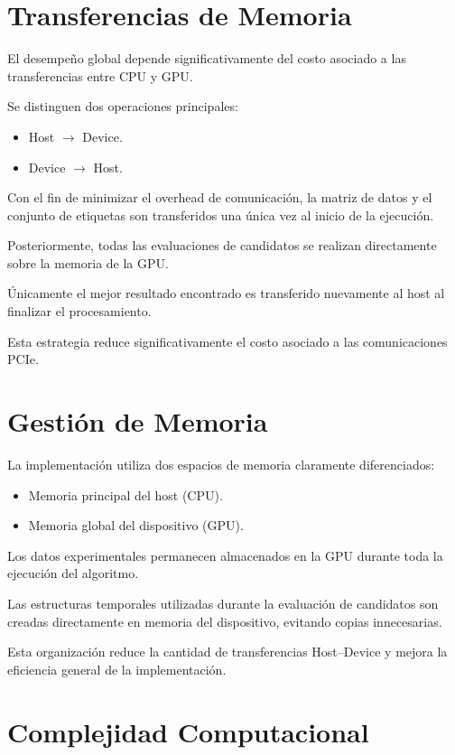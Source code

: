 \section{Transferencias de Memoria}

El desempeño global depende significativamente del costo asociado a las transferencias entre CPU y GPU.

Se distinguen dos operaciones principales:

\begin{itemize}
    \item Host $\rightarrow$ Device.
    \item Device $\rightarrow$ Host.
\end{itemize}

Con el fin de minimizar el overhead de comunicación, la matriz de datos y el conjunto de etiquetas son transferidos una única vez al inicio de la ejecución.

Posteriormente, todas las evaluaciones de candidatos se realizan directamente sobre la memoria de la GPU.

Únicamente el mejor resultado encontrado es transferido nuevamente al host al finalizar el procesamiento.

Esta estrategia reduce significativamente el costo asociado a las comunicaciones PCIe.

\section{Gestión de Memoria}

La implementación utiliza dos espacios de memoria claramente diferenciados:

\begin{itemize}
    \item Memoria principal del host (CPU).
    \item Memoria global del dispositivo (GPU).
\end{itemize}

Los datos experimentales permanecen almacenados en la GPU durante toda la ejecución del algoritmo.

Las estructuras temporales utilizadas durante la evaluación de candidatos son creadas directamente en memoria del dispositivo, evitando copias innecesarias.

Esta organización reduce la cantidad de transferencias Host--Device y mejora la eficiencia general de la implementación.

\section{Complejidad Computacional}

